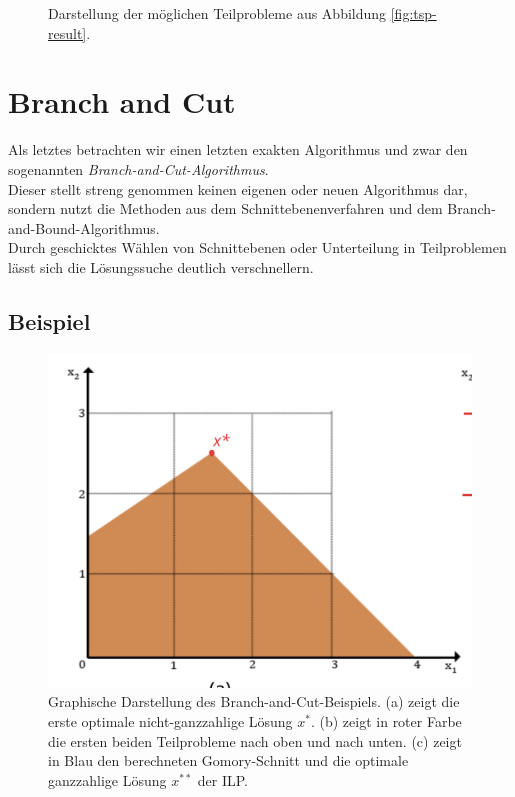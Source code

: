 \documentclass[tog]{acmsiggraph}
\begin{document}
\begin{figure}[ht]
\centering
{}
\caption{Darstellung der möglichen Teilprobleme aus Abbildung \ref{fig:tsp-result}.}
\label{fig:tsp-tree}
\end{figure}

\section{Branch and Cut}

Als letztes betrachten wir einen letzten exakten Algorithmus und zwar den sogenannten \textit{Branch-and-Cut-Algorithmus}.\\
Dieser stellt streng genommen keinen eigenen oder neuen Algorithmus dar, sondern nutzt die Methoden aus dem Schnittebenenverfahren und dem Branch-and-Bound-Algorithmus.\\
Durch geschicktes Wählen von Schnittebenen oder Unterteilung in Teilproblemen lässt sich die Lösungssuche deutlich verschnellern.

\subsection*{Beispiel}

\begin{figure}[t!]
  \centering
  \includegraphics[scale=0.40]{images/bac-example}
  \caption{Graphische Darstellung des Branch-and-Cut-Beispiels. (a) zeigt die erste optimale nicht-ganzzahlige Lösung $x^{*}$. (b) zeigt in roter Farbe die ersten beiden Teilprobleme nach oben und nach unten. (c) zeigt in Blau den berechneten Gomory-Schnitt und die optimale ganzzahlige Lösung $x^{**}$ der ILP. }
  \label{fig:bac-example}
\end{figure}
\end{document}
